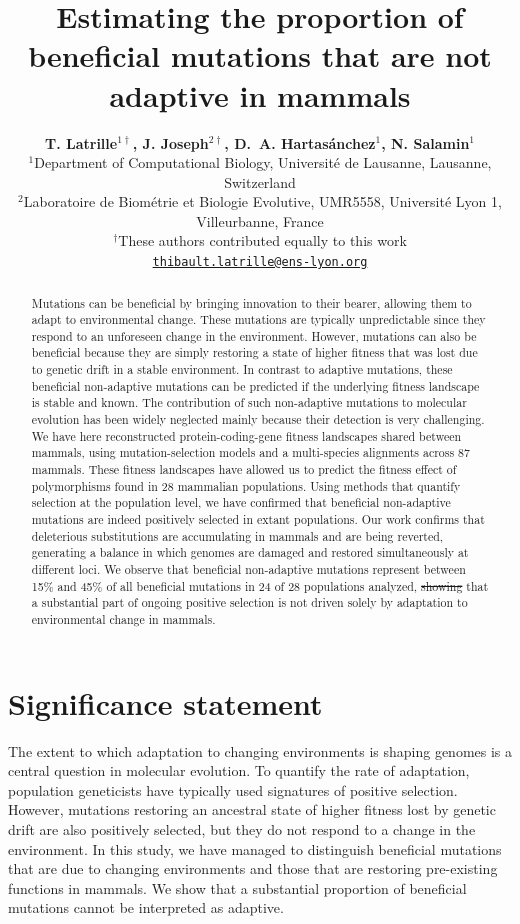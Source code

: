 \documentclass{article}
\title{Estimating the proportion of beneficial mutations that are not adaptive in mammals}
\author{
    \large
    \textbf{T. {Latrille}$^{1\dag}$\orcidlink{0000-0002-9643-4668}, J. {Joseph}$^{2\dag}$\orcidlink{0009-0002-1312-9930}, D.~A. {Hartasánchez}$^{1}$\orcidlink{0000-0003-2596-6883}, N. {Salamin}$^{1}$\orcidlink{0000-0002-3963-4954}}\\
    \normalsize
    $^{1}$Department of Computational Biology, Université de Lausanne, Lausanne, Switzerland\\
    $^{2}$Laboratoire de Biométrie et Biologie Evolutive, UMR5558, Université Lyon 1, Villeurbanne, France \\
    $^{\dag}$These authors contributed equally to this work\\
    \texttt{\href{mailto:thibault.latrille@ens-lyon.org}{thibault.latrille@ens-lyon.org}} \\
}
\providecommand{\DIFaddtex}[1]{{\protect\color{blue}\uwave{#1}}} %
\providecommand{\DIFdeltex}[1]{{\protect\color{red}\sout{#1}}}                      %
\providecommand{\DIFaddbegin}{} %
\providecommand{\DIFaddend}{} %
\providecommand{\DIFdelbegin}{} %
\providecommand{\DIFdelend}{} %
\providecommand{\DIFadd}[1]{\texorpdfstring{\DIFaddtex{#1}}{#1}} %
\providecommand{\DIFdel}[1]{\texorpdfstring{\DIFdeltex{#1}}{}} %
\newcommand{\DIFscaledelfig}{0.5}
\newlength{\DIFdelgraphicswidth} %
\newlength{\DIFdelgraphicsheight} %
\newcommand{\DIFaddincludegraphics}[2][]{{\color{blue}\fbox{\DIFOincludegraphics[#1]{#2}}}} %
\newcommand{\DIFdelincludegraphics}[2][]{%
\sbox{\DIFdelgraphicsbox}{\DIFOincludegraphics[#1]{#2}}%
\settoboxwidth{\DIFdelgraphicswidth}{\DIFdelgraphicsbox} %
\settoboxtotalheight{\DIFdelgraphicsheight}{\DIFdelgraphicsbox} %
\scalebox{\DIFscaledelfig}{%
\parbox[b]{\DIFdelgraphicswidth}{\usebox{\DIFdelgraphicsbox}\\[-\baselineskip] \rule{\DIFdelgraphicswidth}{0em}}\llap{\resizebox{\DIFdelgraphicswidth}{\DIFdelgraphicsheight}{%
\setlength{\unitlength}{\DIFdelgraphicswidth}%
\begin{picture}(1,1)%
\thicklines\linethickness{2pt} %
{\color[rgb]{1,0,0}\put(0,0){\framebox(1,1){}}}%
{\color[rgb]{1,0,0}\put(0,0){\line( 1,1){1}}}%
{\color[rgb]{1,0,0}\put(0,1){\line(1,-1){1}}}%
\end{picture}%
}\hspace*{3pt}}} %
} %
\DeclareRobustCommand{\DIFaddbegin}{\DIFOaddbegin \let\includegraphics\DIFaddincludegraphics} %
\DeclareRobustCommand{\DIFaddend}{\DIFOaddend \let\includegraphics\DIFOincludegraphics} %
\DeclareRobustCommand{\DIFdelbegin}{\DIFOdelbegin \let\includegraphics\DIFdelincludegraphics} %
\DeclareRobustCommand{\DIFdelend}{\DIFOaddend \let\includegraphics\DIFOincludegraphics} %
\begin{document}
    \maketitle

    \begin{abstract}
        Mutations can be beneficial by bringing innovation to their bearer, allowing them to adapt to environmental change. These mutations are typically unpredictable since they respond to an unforeseen change in the environment. However, mutations can also be beneficial because they are simply restoring a state of higher fitness that was lost due to genetic drift in a stable environment. In contrast to adaptive mutations, these beneficial non-adaptive mutations can be predicted if the underlying fitness landscape is stable and known. The contribution of such non-adaptive mutations to molecular evolution has been widely neglected mainly because their detection is very challenging. We have here reconstructed protein-coding-gene fitness landscapes shared between mammals, using mutation-selection models and a multi-species alignments across 87 mammals. These fitness landscapes have allowed us to predict the fitness effect of polymorphisms found in 28 mammalian populations. Using methods that quantify selection at the population level, we have confirmed that beneficial non-adaptive mutations are indeed positively selected in extant populations. Our work confirms that deleterious substitutions are accumulating in mammals and are being reverted, generating a balance in which genomes are damaged and restored simultaneously at different loci. We observe that beneficial non-adaptive mutations represent between 15\% and 45\% of all beneficial mutations in 24 of 28 populations analyzed, \DIFdelbegin \DIFdel{showing }\DIFdelend \DIFaddbegin \DIFadd{suggesting }\DIFaddend that a substantial part of ongoing positive selection is not driven solely by adaptation to environmental change in mammals.
    \end{abstract}


    \section*{Significance statement}
    The extent to which adaptation to changing environments is shaping genomes is a central question in molecular evolution. To quantify the rate of adaptation, population geneticists have typically used signatures of positive selection. However, mutations restoring an ancestral state of higher fitness lost by genetic drift are also positively selected, but they do not respond to a change in the environment. In this study, we have managed to distinguish beneficial mutations that are due to changing environments and those that are restoring pre-existing functions in mammals. We show that a substantial proportion of beneficial mutations cannot be interpreted as adaptive.
\end{document}
